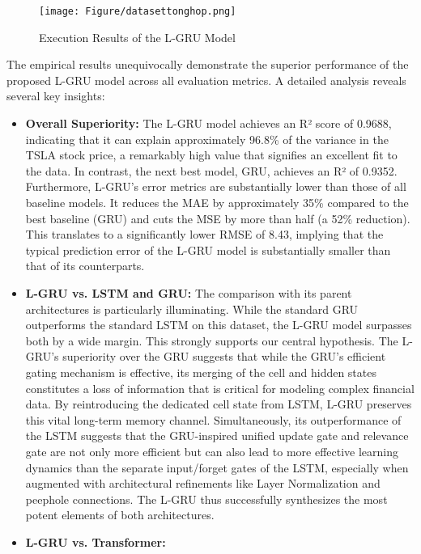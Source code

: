 \documentclass{cys}
\begin{document}
\begin{enumerate}
    \begin{figure}[h!]
        \centering
        \texttt{[image: Figure/datasettonghop.png]}
        \caption{Execution Results of the L‑GRU Model}
        \label{fig:execution}
    \end{figure}

    The empirical results unequivocally demonstrate the superior performance of the proposed L-GRU model across all evaluation metrics. A detailed analysis reveals several key insights:
    \begin{itemize}
        \item \textbf{Overall Superiority:}
        The L-GRU model achieves an R² score of 0.9688, indicating that it can explain approximately 96.8\% of the variance in the TSLA stock price, a remarkably high value that signifies an excellent fit to the data. In contrast, the next best model, GRU, achieves an R² of 0.9352. Furthermore, L-GRU's error metrics are substantially lower than those of all baseline models. It reduces the MAE by approximately 35\% compared to the best baseline (GRU) and cuts the MSE by more than half (a 52\% reduction). This translates to a significantly lower RMSE of 8.43, implying that the typical prediction error of the L-GRU model is substantially smaller than that of its counterparts.
        \item \textbf{L-GRU vs. LSTM and GRU:}
        The comparison with its parent architectures is particularly illuminating. While the standard GRU outperforms the standard LSTM on this dataset, the L-GRU model surpasses both by a wide margin. This strongly supports our central hypothesis. The L-GRU's superiority over the GRU suggests that while the GRU's efficient gating mechanism is effective, its merging of the cell and hidden states constitutes a loss of information that is critical for modeling complex financial data. By reintroducing the dedicated cell state from LSTM, L-GRU preserves this vital long-term memory channel. Simultaneously, its outperformance of the LSTM suggests that the GRU-inspired unified update gate and relevance gate are not only more efficient but can also lead to more effective learning dynamics than the separate input/forget gates of the LSTM, especially when augmented with architectural refinements like Layer Normalization and peephole connections. The L-GRU thus successfully synthesizes the most potent elements of both architectures.
        \item \textbf{L-GRU vs. Transformer:}

\end{itemize}
\end{enumerate}
\end{document}
